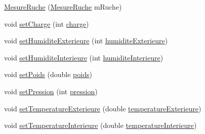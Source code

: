 \begin{DoxyCompactItemize}
\item 
\hyperlink{classcom_1_1example_1_1bee__honeyt_1_1_mesure_ruche_a1585041919b80789002c833778231a41}{Mesure\+Ruche} (\hyperlink{classcom_1_1example_1_1bee__honeyt_1_1_mesure_ruche}{Mesure\+Ruche} m\+Ruche)
\item 
void \hyperlink{classcom_1_1example_1_1bee__honeyt_1_1_mesure_ruche_aaa185bf82c41c889d3e60804da25bd30}{set\+Charge} (int \hyperlink{classcom_1_1example_1_1bee__honeyt_1_1_mesure_ruche_a5ac02bc1d6195faa400e5a3171eed3f4}{charge})
\item 
void \hyperlink{classcom_1_1example_1_1bee__honeyt_1_1_mesure_ruche_aacb223667567aa9c8a73535f43cda985}{set\+Humidite\+Exterieure} (int \hyperlink{classcom_1_1example_1_1bee__honeyt_1_1_mesure_ruche_aa5521e97dfa98051bff9fd8d3ca3f34d}{humidite\+Exterieure})
\item 
void \hyperlink{classcom_1_1example_1_1bee__honeyt_1_1_mesure_ruche_a8f2d166ffd8340562d9e5cbe5ea5f907}{set\+Humidite\+Interieure} (int \hyperlink{classcom_1_1example_1_1bee__honeyt_1_1_mesure_ruche_a3b5d2536649e0acaf1eebeba4409c9bb}{humidite\+Interieure})
\item 
void \hyperlink{classcom_1_1example_1_1bee__honeyt_1_1_mesure_ruche_aecea2cf7cc504caa34bef93a0e1f3826}{set\+Poids} (double \hyperlink{classcom_1_1example_1_1bee__honeyt_1_1_mesure_ruche_a9aa6c575b7b69c4fb3825944e1f50722}{poids})
\item 
void \hyperlink{classcom_1_1example_1_1bee__honeyt_1_1_mesure_ruche_a87cff86af4a7e977aac1caeaf6a37bc8}{set\+Pression} (int \hyperlink{classcom_1_1example_1_1bee__honeyt_1_1_mesure_ruche_ae78080a6d5745faa411e3cfbdbf8aeec}{pression})
\item 
void \hyperlink{classcom_1_1example_1_1bee__honeyt_1_1_mesure_ruche_a41591480ad8be13a1c7e2e7049dc7935}{set\+Temperature\+Exterieure} (double \hyperlink{classcom_1_1example_1_1bee__honeyt_1_1_mesure_ruche_ac13ff0ed6c96cf755097510acf202521}{temperature\+Exterieure})
\item 
void \hyperlink{classcom_1_1example_1_1bee__honeyt_1_1_mesure_ruche_a5364a38970b37df66bb8cb6f5b3d3741}{set\+Temperature\+Interieure} (double \hyperlink{classcom_1_1example_1_1bee__honeyt_1_1_mesure_ruche_afd0ecabb4e519d5bcfee33ac15b8b742}{temperature\+Interieure})
\end{DoxyCompactItemize}
